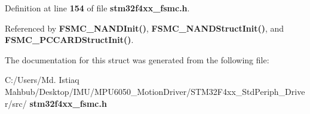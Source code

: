 Definition at line \textbf{ 154} of file \textbf{ stm32f4xx\+\_\+fsmc.\+h}.



Referenced by \textbf{ F\+S\+M\+C\+\_\+\+N\+A\+N\+D\+Init()}, \textbf{ F\+S\+M\+C\+\_\+\+N\+A\+N\+D\+Struct\+Init()}, and \textbf{ F\+S\+M\+C\+\_\+\+P\+C\+C\+A\+R\+D\+Struct\+Init()}.



The documentation for this struct was generated from the following file\+:\begin{DoxyCompactItemize}
\item 
C\+:/\+Users/\+Md. Istiaq Mahbub/\+Desktop/\+I\+M\+U/\+M\+P\+U6050\+\_\+\+Motion\+Driver/\+S\+T\+M32\+F4xx\+\_\+\+Std\+Periph\+\_\+\+Driver/src/\textbf{ stm32f4xx\+\_\+fsmc.\+h}\end{DoxyCompactItemize}
